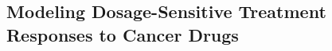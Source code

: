 \subsection{Modeling Dosage-Sensitive Treatment Responses to Cancer Drugs} \label{sec:eval_scalar}



